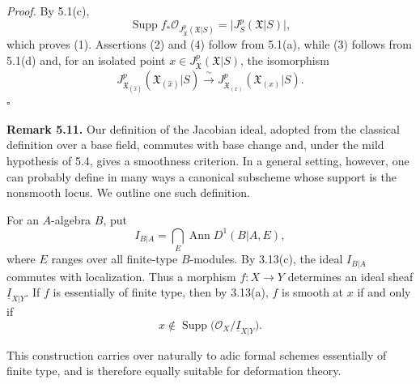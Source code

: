 \smallskip
\noindent\textit{Proof.}
By 5.1(c),
\[
\operatorname{Supp}
 f_*\mathcal O_{J_{\mathfrak X}^p(\mathfrak X|S)}
=\bigl|J_S^p(\mathfrak X|S)\bigr|,
\]
which proves (1). Assertions (2) and (4) follow from 5.1(a), while
(3) follows from 5.1(d) and, for an isolated point
$x\in J_{\mathfrak X}^p(\mathfrak X|S)$, the isomorphism
\[
J_{\mathfrak X_{(\widehat{x})}}^p
 (\mathfrak X_{(\widehat{x})}|S)
\xrightarrow{\ \sim\ }
J_{\mathfrak X_{(x)}}^p(\mathfrak X_{(x)}|S).
\]
\hfill$\square$

\medskip
\noindent\textbf{Remark 5.11.}
Our definition of the Jacobian ideal, adopted from the classical
definition over a base field, commutes with base change and, under the
mild hypothesis of 5.4, gives a smoothness criterion. In a general
setting, however, one can probably define in many ways a canonical
subscheme whose support is the nonsmooth locus. We outline one such
definition.

For an $A$-algebra $B$, put
\[
I_{B|A}=\bigcap_E\operatorname{Ann}D^1(B|A,E),
\]
where $E$ ranges over all finite-type $B$-modules. By 3.13(c), the
ideal $I_{B|A}$ commutes with localization. Thus a morphism
$f:X\longrightarrow Y$ determines an ideal sheaf
$\underline I_{X|Y}$. If $f$ is essentially of finite type, then by
3.13(a), $f$ is smooth at $x$ if and only if
\[
x\notin\operatorname{Supp}
 \bigl(\mathcal O_X/\underline I_{X|Y}\bigr).
\]


This construction carries over naturally to adic formal schemes
essentially of finite type, and is therefore equally suitable for
deformation theory.

